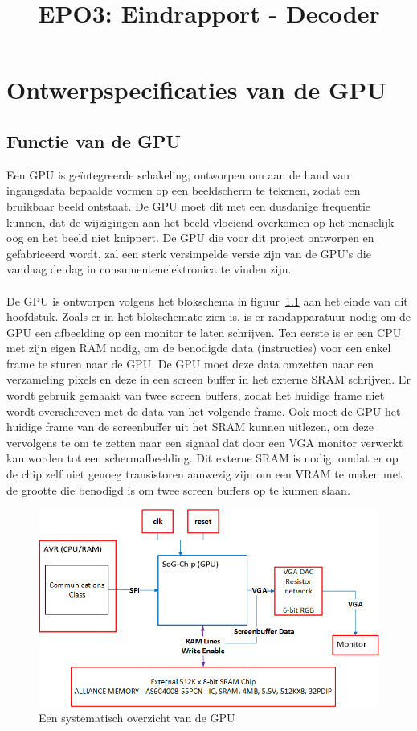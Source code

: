 \documentclass{scrartcl} %
\author{}
\title{EPO3: Eindrapport - Decoder}
\begin{document}
\chapter{Ontwerpspecificaties van de GPU}
\label{ch:spec}

\section {Functie van de GPU}
Een GPU is geïntegreerde schakeling, ontworpen om aan de hand van ingangsdata bepaalde vormen op een beeldscherm te tekenen, zodat een bruikbaar beeld ontstaat. De GPU moet dit met een dusdanige frequentie kunnen, dat de wijzigingen aan het beeld vloeiend overkomen op het menselijk oog en het beeld niet knippert. De GPU die voor dit project ontworpen en gefabriceerd wordt, zal een sterk versimpelde versie zijn van de GPU's die vandaag de dag in consumentenelektronica te vinden zijn.
\\\\
De GPU is ontworpen volgens het blokschema in figuur~\ref{fig:spec-overzicht} aan het einde van dit hoofdstuk.
Zoals er in het blokschemate zien is, is er randapparatuur nodig om de GPU een afbeelding op een monitor te laten schrijven. Ten eerste is er een CPU met zijn eigen RAM nodig, om de benodigde data (instructies) voor een enkel frame te sturen naar de GPU. De GPU moet deze data omzetten naar een verzameling pixels en deze in een screen buffer in het externe SRAM schrijven. Er wordt gebruik gemaakt van twee screen buffers, zodat het huidige frame niet wordt overschreven met de data van het volgende frame. Ook moet de GPU het huidige frame van de screenbuffer uit het SRAM kunnen uitlezen, om deze vervolgens te om te zetten naar een signaal dat door een VGA monitor verwerkt kan worden tot een schermafbeelding. Dit externe SRAM is nodig, omdat er op de chip zelf niet genoeg transistoren aanwezig zijn om een VRAM te maken met de grootte die benodigd is om twee screen buffers op te kunnen slaan.

\begin{figure}[H]
\centering
	\includegraphics[scale=0.7]{Resource/system_overview.png}
	\caption{Een systematisch overzicht van de GPU}
	\label{fig:spec-overzicht}
\end{figure} 
\end{document}
